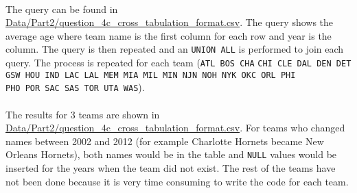 \paragraph{}The query can be found in \url{Data/Part2/question_4c_cross_tabulation_format.csv}.
The query shows the average age where team name is the first column for each row and year is the column. The query is then repeated and an \verb|UNION ALL| is performed to join each query. The process is repeated for each team (\verb|ATL BOS CHA| \verb|CHI CLE DAL DEN DET GSW HOU IND LAC LAL MEM MIA MIL MIN NJN NOH NYK OKC ORL PHI| \\ \verb|PHO POR SAC SAS TOR UTA WAS|).

\paragraph{}The results for 3 teams are shown in \url{Data/Part2/question_4c_cross_tabulation_format.csv}.  For teams who changed names between 2002 and 2012 (for example Charlotte Hornets became New Orleans Hornets), both names would be in the table and \verb|NULL| values would be inserted for the years when the team did not exist. The rest of the teams have not been done because it is very time consuming to write the code for each team.
